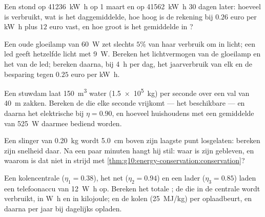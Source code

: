 \begin{exercise}[$\star\star$]\label{exo:g10:energy-conservation:8}
Een  stond op \qty{41236}{kW.h} op 1 maart en op \qty{41562}{kW.h}
30 dagen later: hoeveel  is verbruikt, wat is het daggemiddelde,
hoe hoog is de rekening bij $0.26$ euro per \unit{kW.h} plus $12$ euro
vast, en hoe groot is het gemiddelde  in ?
\end{exercise}

\begin{exercise}[$\star\star$]\label{exo:g10:energy-conservation:9}
Een oude gloeilamp van \qty{60}{W} zet slechts $5\%$ van haar verbruik om
in licht; een led geeft hetzelfde licht met \qty{9}{W}. Bereken het
lichtvermogen van de gloeilamp en het  van de led; bereken
daarna, bij \qty{4}{h} per dag, het jaarverbruik van elk en de besparing
tegen $0.25$ euro per \unit{kW.h}.
\end{exercise}

\begin{exercise}[$\star\star$]\label{exo:g10:energy-conservation:10}
Een stuwdam laat \qty{150}{m^3} water (\qty{1.5e5}{kg}) per seconde over
een val van \qty{40}{m} zakken. Bereken de  die elke
seconde vrijkomt --- het beschikbare  --- en daarna het
elektrische  bij $\eta = 0.90$, en hoeveel huishoudens met een
gemiddelde van \qty{525}{W} daarmee bediend worden.
\end{exercise}

\begin{exercise}[$\star\star$]\label{exo:g10:energy-conservation:11}
Een slinger van \qty{0.20}{kg} wordt \qty{5.0}{cm} boven zijn laagste
punt losgelaten: bereken zijn snelheid daar. Na een paar minuten hangt
hij stil: waar is zijn  gebleven, en waarom is dat niet in strijd
met \cref{thm:g10:energy-conservation:conservation}?
\end{exercise}

\begin{exercise}[$\star\star\star$]\label{exo:g10:energy-conservation:12}
Een kolencentrale ($\eta_1 = 0.38$), het net ($\eta_2 = 0.94$) en een
lader ($\eta_3 = 0.85$) laden een telefoonaccu van \qty{12}{W.h} op.
Bereken het totale ; de  die in de centrale
wordt verbruikt, in \unit{W.h} en in kilojoule; en de kolen
(\qty{25}{MJ/kg}) per oplaadbeurt, en daarna per jaar bij dagelijks
opladen.
\end{exercise}

